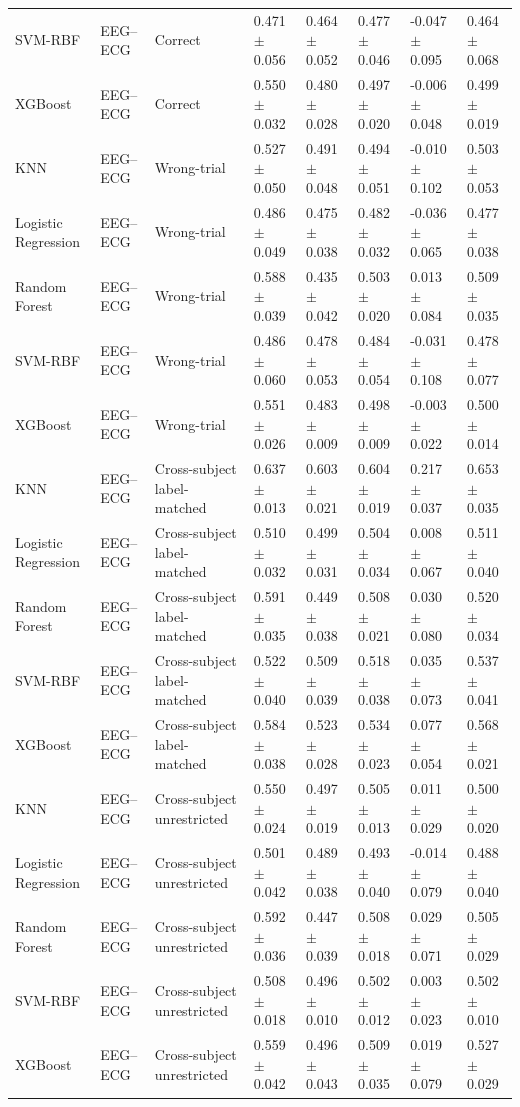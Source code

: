 \begin{table}[!t]
\begin{tabular}{llllllll}
SVM-RBF & EEG--ECG & Correct & 0.471 $\pm$ 0.056 & 0.464 $\pm$ 0.052 & 0.477 $\pm$ 0.046 & -0.047 $\pm$ 0.095 & 0.464 $\pm$ 0.068 \\
XGBoost & EEG--ECG & Correct & 0.550 $\pm$ 0.032 & 0.480 $\pm$ 0.028 & 0.497 $\pm$ 0.020 & -0.006 $\pm$ 0.048 & 0.499 $\pm$ 0.019 \\
KNN & EEG--ECG & Wrong-trial & 0.527 $\pm$ 0.050 & 0.491 $\pm$ 0.048 & 0.494 $\pm$ 0.051 & -0.010 $\pm$ 0.102 & 0.503 $\pm$ 0.053 \\
Logistic Regression & EEG--ECG & Wrong-trial & 0.486 $\pm$ 0.049 & 0.475 $\pm$ 0.038 & 0.482 $\pm$ 0.032 & -0.036 $\pm$ 0.065 & 0.477 $\pm$ 0.038 \\
Random Forest & EEG--ECG & Wrong-trial & 0.588 $\pm$ 0.039 & 0.435 $\pm$ 0.042 & 0.503 $\pm$ 0.020 & 0.013 $\pm$ 0.084 & 0.509 $\pm$ 0.035 \\
SVM-RBF & EEG--ECG & Wrong-trial & 0.486 $\pm$ 0.060 & 0.478 $\pm$ 0.053 & 0.484 $\pm$ 0.054 & -0.031 $\pm$ 0.108 & 0.478 $\pm$ 0.077 \\
XGBoost & EEG--ECG & Wrong-trial & 0.551 $\pm$ 0.026 & 0.483 $\pm$ 0.009 & 0.498 $\pm$ 0.009 & -0.003 $\pm$ 0.022 & 0.500 $\pm$ 0.014 \\
KNN & EEG--ECG & Cross-subject label-matched & 0.637 $\pm$ 0.013 & 0.603 $\pm$ 0.021 & 0.604 $\pm$ 0.019 & 0.217 $\pm$ 0.037 & 0.653 $\pm$ 0.035 \\
Logistic Regression & EEG--ECG & Cross-subject label-matched & 0.510 $\pm$ 0.032 & 0.499 $\pm$ 0.031 & 0.504 $\pm$ 0.034 & 0.008 $\pm$ 0.067 & 0.511 $\pm$ 0.040 \\
Random Forest & EEG--ECG & Cross-subject label-matched & 0.591 $\pm$ 0.035 & 0.449 $\pm$ 0.038 & 0.508 $\pm$ 0.021 & 0.030 $\pm$ 0.080 & 0.520 $\pm$ 0.034 \\
SVM-RBF & EEG--ECG & Cross-subject label-matched & 0.522 $\pm$ 0.040 & 0.509 $\pm$ 0.039 & 0.518 $\pm$ 0.038 & 0.035 $\pm$ 0.073 & 0.537 $\pm$ 0.041 \\
XGBoost & EEG--ECG & Cross-subject label-matched & 0.584 $\pm$ 0.038 & 0.523 $\pm$ 0.028 & 0.534 $\pm$ 0.023 & 0.077 $\pm$ 0.054 & 0.568 $\pm$ 0.021 \\
KNN & EEG--ECG & Cross-subject unrestricted & 0.550 $\pm$ 0.024 & 0.497 $\pm$ 0.019 & 0.505 $\pm$ 0.013 & 0.011 $\pm$ 0.029 & 0.500 $\pm$ 0.020 \\
Logistic Regression & EEG--ECG & Cross-subject unrestricted & 0.501 $\pm$ 0.042 & 0.489 $\pm$ 0.038 & 0.493 $\pm$ 0.040 & -0.014 $\pm$ 0.079 & 0.488 $\pm$ 0.040 \\
Random Forest & EEG--ECG & Cross-subject unrestricted & 0.592 $\pm$ 0.036 & 0.447 $\pm$ 0.039 & 0.508 $\pm$ 0.018 & 0.029 $\pm$ 0.071 & 0.505 $\pm$ 0.029 \\
SVM-RBF & EEG--ECG & Cross-subject unrestricted & 0.508 $\pm$ 0.018 & 0.496 $\pm$ 0.010 & 0.502 $\pm$ 0.012 & 0.003 $\pm$ 0.023 & 0.502 $\pm$ 0.010 \\
XGBoost & EEG--ECG & Cross-subject unrestricted & 0.559 $\pm$ 0.042 & 0.496 $\pm$ 0.043 & 0.509 $\pm$ 0.035 & 0.019 $\pm$ 0.079 & 0.527 $\pm$ 0.029 \\
\bottomrule
\end{tabular}
\end{table}